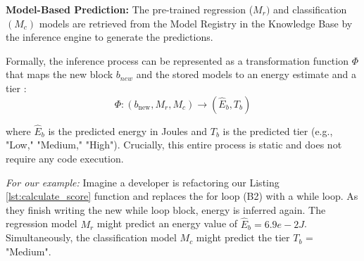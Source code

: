 \noindent
\textbf{Model-Based Prediction:} The pre-trained regression (\(M_r)\) and classification \((M_c)\) models are retrieved from the Model Registry in the Knowledge Base by the inference engine to generate the predictions.

\noindent
Formally, the inference process can be represented as a transformation function \(\Phi\) that maps the new block \(b_{new}\) and the stored models to an energy estimate and a tier : 
\begin{equation}
\Phi \colon (b_{\text{new}}, M_r, M_c) \to (\hat{E}_b, T_b)
\end{equation}


\noindent
where \(\hat{E}_b\) is the predicted energy in Joules and \(T_b\) is the predicted tier (e.g., "Low," "Medium," "High"). Crucially, this entire process is static and does not require any code execution. 

\noindent
\textit{For our example:} Imagine a developer is refactoring our Listing \ref{lst:calculate_score} function and replaces the for loop (B2) with a while loop.
 As they finish writing the new while loop block, energy is inferred again. The regression model \(M_r\) might predict an energy value of \(\hat{E}_b = 6.9e-2 J\). Simultaneously, the classification model \(M_c\) might predict the tier \(T_b\) = "Medium".





